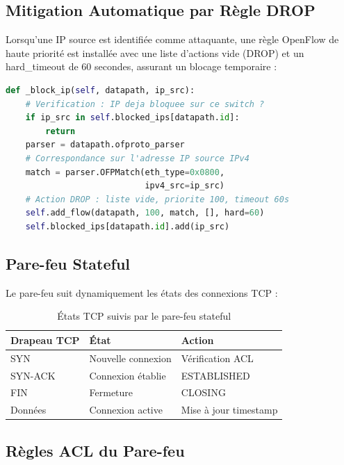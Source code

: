 \documentclass[12pt,a4paper]{report}
\begin{document}
\subsection{Mitigation Automatique par Règle DROP}
Lorsqu'une IP source est identifiée comme attaquante,
une règle OpenFlow de haute priorité est installée avec
une liste d'actions vide (DROP) et un hard\_timeout de
60 secondes, assurant un blocage temporaire :

\begin{lstlisting}[language=Python,
caption=Blocage DROP d'une IP suspecte (ddos\_detector.py)]
def _block_ip(self, datapath, ip_src):
    # Verification : IP deja bloquee sur ce switch ?
    if ip_src in self.blocked_ips[datapath.id]:
        return
    parser = datapath.ofproto_parser
    # Correspondance sur l'adresse IP source IPv4
    match = parser.OFPMatch(eth_type=0x0800,
                            ipv4_src=ip_src)
    # Action DROP : liste vide, priorite 100, timeout 60s
    self.add_flow(datapath, 100, match, [], hard=60)
    self.blocked_ips[datapath.id].add(ip_src)
\end{lstlisting}

\subsection{Pare-feu Stateful}
Le pare-feu suit dynamiquement les états des connexions TCP :

\begin{table}[H]
\centering
\caption{États TCP suivis par le pare-feu stateful}
\label{tab:tcp_states}
\begin{tabular}{lll}
\toprule
\textbf{Drapeau TCP} & \textbf{État} & \textbf{Action} \\
\midrule
SYN & Nouvelle connexion & Vérification ACL \\
SYN-ACK & Connexion établie & ESTABLISHED \\
FIN & Fermeture & CLOSING \\
Données & Connexion active & Mise à jour timestamp \\
\bottomrule
\end{tabular}
\end{table}

\subsection{Règles ACL du Pare-feu}
\end{document}
